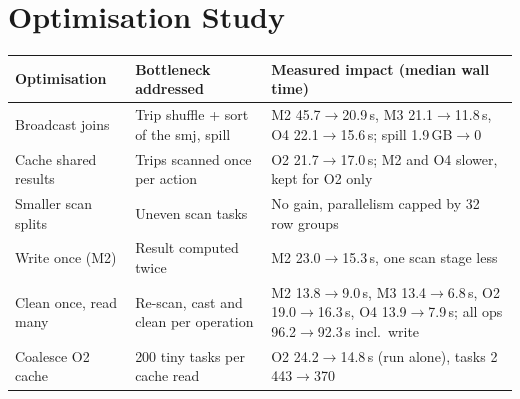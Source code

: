 \documentclass[sigconf]{acmart}
\begin{document}
\section{Optimisation Study}

\begin{table}[!t]
      \centering
      \footnotesize
      \begin{tabular}{p{3.0cm}p{4.4cm}p{9.2cm}}
            \toprule Optimisation              & Bottleneck addressed                        & Measured impact (median wall time)                                                                                                                                                   \\
            \midrule Broadcast joins           & Trip shuffle + sort of the \gls{smj}, spill & M2 45.7$\to$20.9\,s, M3 21.1$\to$11.8\,s, O4 22.1$\to$15.6\,s; spill 1.9\,GB$\to$0                                                                                                   \\
            Cache shared results               & Trips scanned once per action               & O2 21.7$\to$17.0\,s; M2 and O4 slower, kept for O2 only                                                                                                                              \\
            Smaller scan splits                & Uneven scan tasks                           & No gain, parallelism capped by 32 row groups                                                                                                                                         \\
            Write once (M2)                    & Result computed twice                       & M2 23.0$\to$15.3\,s, one scan stage less                                                                                                                                             \\
            Clean once, read many              & Re-scan, cast and clean per operation       & M2 13.8$\to$9.0\,s, M3 13.4$\to$6.8\,s, O2 19.0$\to$16.3\,s, O4 13.9$\to$7.9\,s; all ops 96.2$\to$92.3\,s incl.\ write                                                               \\
            Coalesce O2 cache                  & 200 tiny tasks per cache read               & O2 24.2$\to$14.8\,s (run alone), tasks 2\,443$\to$370                                                                                                                                \\

\end{tabular}
\end{table}
\end{document}
